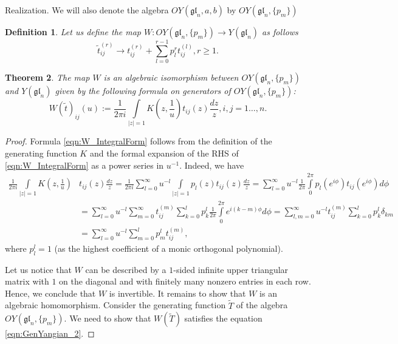 \documentclass[10pt]{article}%
\numberwithin{equation}{section}
\newtheorem{thm}{Theorem}[section]
\newtheorem{defin}[thm]{Definition}
\newcommand{\gl}{{\mathfrak{gl}}}
\begin{document}
\begin{paragraph}{Realization.}
We will also denote the algebra $OY(\gl_n,a,b)$ by $OY(\gl_n,\{p_m\})$ 
\begin{defin}
  Let us define the map $W:OY(\gl_n,\{p_m\})\to Y(\gl_n)$ as follows
  \[
\tilde{t}_{ij}^{(r)}\to t_{ij}^{(r)}+\sum\limits_{l=0}^{r-1} p_l^r t_{ij}^{(l)},r\geq 1.
  \]
\end{defin}

\begin{thm}\label{thm:ImageYangian}
    The map $W$ is an algebraic isomorphism between $OY(\gl_n,\{p_m\})$ and $Y(\gl_n)$ given by the following formula on generators of $OY(\gl_n,\{p_m\})$:
\begin{equation}\label{eqn:W_IntegralForm}
W(\tilde{t})_{ij}(u):=\frac{1}{2\pi i}\int\limits_{|z|=1} K(z,\frac{1}{u})t_{ij}(z)\frac{dz}{z},i,j=1\ldots,n. 
\end{equation} 
\end{thm}
\begin{proof}
Formula \eqref{eqn:W_IntegralForm} follows from the definition of the generating function $K$ and the formal expansion of the RHS of \eqref{eqn:W_IntegralForm} as a power series in $u^{-1}$. Indeed, we have
\begin{eqnarray}
    \frac{1}{2\pi i}\int\limits_{|z|=1} K(z,\frac{1}{u})&t_{ij}(z)\frac{dz}{z}=\frac{1}{2\pi i}\sum\limits_{l=0}^{\infty}u^{-l}\int\limits_{|z|=1}p_l(z)t_{ij}(z)\frac{dz}{z}=
    \sum\limits_{l=0}^{\infty}u^{-l}\frac{1}{2\pi}\int\limits_{0}^{2\pi} p_l(e^{i\phi})t_{ij}(e^{i\phi})d\phi\\
    &=\sum\limits_{l=0}^{\infty}u^{-l}\sum\limits_{m=0}^{\infty} t_{ij}^{(m)}\sum\limits_{k=0}^l p_k^l\frac{1}{2\pi}\int\limits_{0}^{2\pi}e^{i(k-m)\phi}d\phi=\sum\limits_{l,m=0}^{\infty}u^{-l}t_{ij}^{(m)}\sum\limits_{k=0}^l p_k^l \delta_{km}\\
    &=\sum\limits_{l=0}^{\infty}u^{-l}\sum\limits_{m=0}^{l}p_m^l t_{ij}^{(m)},
\end{eqnarray}
where $p_l^{l}=1$ (as the highest coefficient of a monic orthogonal polynomial).

Let us notice that $W$ can be described by a $1$-sided infinite upper triangular matrix with $1$ on the diagonal and with finitely many nonzero entries in each row. Hence, we conclude that $W$ is invertible. 
It remains to show that $W$ is an algebraic homomorphism.  Consider the generating function $\tilde{T}$ of the algebra $OY(\gl_n,\{p_m\})$. We need to show that $W(\tilde{T})$  satisfies the equation \eqref{eqn:GenYangian_2}.


\end{proof}
\end{paragraph}
\end{document}
